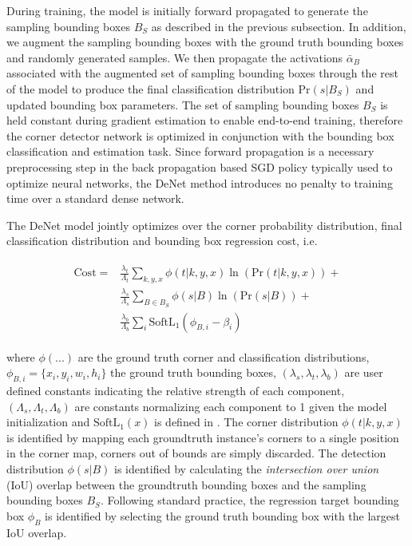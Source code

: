 \documentclass[10pt,twocolumn]{article}
\begin{document}
During training, the model is initially forward propagated to generate the sampling bounding boxes $B_S$ as described in the previous subsection. In addition, we augment the sampling bounding boxes with the ground truth bounding boxes and randomly generated samples. We then propagate the activations $\bar{\alpha}_B$ associated with the augmented set of sampling bounding boxes through the rest of the model to produce the final classification distribution $\mathrm{Pr}(s | B_S)$ and updated bounding box parameters. The set of sampling bounding boxes $B_S$ is held constant during gradient estimation to enable end-to-end training, therefore the corner detector network is optimized in conjunction with the bounding box classification and estimation task. Since forward propagation is a necessary preprocessing step in the back propagation based SGD policy typically used to optimize neural networks, the DeNet method introduces no penalty to training time over a standard dense network. 

The DeNet model jointly optimizes over the corner probability distribution, final classification distribution and bounding box regression cost, i.e.

\begin{gather}
\label{eq:cost}
\begin{split}
\mathrm{Cost} =& \frac{\lambda_t}{\Lambda_t} \sum_{k,y,x} \phi(t | k,y,x) \ln(\mathrm{Pr}(t | k,y,x) ) + \\ & \frac{\lambda_s}{\Lambda_s} \sum_{B \in B_S} \phi(s| B) \ln(\mathrm{Pr}(s|B) ) +  \\ &
\frac{\lambda_b}{\Lambda_b} \sum_i \mathrm{SoftL_1}(\phi_{B,i} - \beta_i)
\end{split}
\end{gather}

where $\phi(...)$ are the ground truth corner and classification distributions, $\phi_{B,i} = \lbrace x_i,y_i,w_i,h_i \rbrace$ the ground truth bounding boxes, $(\lambda_s,\lambda_t,\lambda_b)$ are user defined constants indicating the relative strength of each component, $(\Lambda_s,\Lambda_t,\Lambda_b)$ are constants normalizing each component to 1 given the model initialization and $\mathrm{SoftL_1}(x)$ is defined in \cite{fast-rcnn}. The corner distribution $\phi(t | k,y,x)$ is identified by mapping each groundtruth instance's corners to a single position in the corner map, corners out of bounds are simply discarded. The detection distribution $\phi(s| B)$ is identified by calculating the \textit{intersection over union} (IoU) overlap between the groundtruth bounding boxes and the sampling bounding boxes $B_S$. Following standard practice, the regression target bounding box $\phi_B$ is identified by selecting the ground truth bounding box with the largest IoU overlap. 
\end{document}
